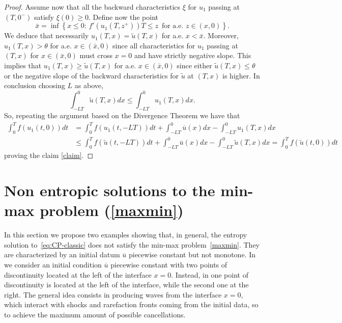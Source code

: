 \documentclass[a4paper, 10pt, final]{article}
\begin{document}
\begin{proof}
  Assume now that all the 
  backward characteristics $\xi$ for $u_1$ passing at $(T,0^-)$ satisfy $\xi(0) \ge 0$. 
  Define now the point
  \begin{equation*}
    \bar x = \inf \left\{x\leq 0\colon\,  f'(u_1(T,z^+))T \le z \, 
    \text{ for a.e. $z\in (x,0)$}\right\}.
  \end{equation*}  
  We deduce that  necessarily $u_1(T,x)=\widetilde u(T,x)$ for a.e. $x< \bar x$. 
  Moreover,  $u_1(T,x)> \theta$ for a.e. $x\in (\bar x, 0)$ 
  since all characteristics for $u_1$ passing at $(T,x)$ for $x\in (\bar x, 0)$ must cross $x=0$ and have strictly negative slope.
  This implies that $u_1(T,x)\geq \widetilde u(T,x)$ for a.e. $x\in (\bar x, 0)$ since either $\widetilde u(T,x)\leq \theta$
   or the negative slope of the backward characteristics for $\widetilde u$ at $(T,x)$ is higher. 
  In conclusion choosing $L$ as above, 
  \[\int_{-LT}^0 \widetilde u(T,x)dx\leq \int_{-LT}^0  u_1(T,x)dx. \]
  So, repeating the argument based on the Divergence Theorem 
  we have that
  \begin{align*}
    \int_0^{T} f(u_1(t,0))dt
    & = \int_0^{T} f(u_1(t, -LT))dt + \int_{-LT}^0 \overline u(x) dx -\int_{-LT}^0 u_1(T,x)dx
    \\
    & \leq  \int_0^{T} f(\widetilde u(t, -LT))dt + \int_{-LT}^0  \overline u (x)dx 
    -\int_{-LT}^0 \widetilde u(T,x)dx
    = \int_0^{T} f(\widetilde u(t,0))dt
  \end{align*}
  proving the claim \eqref{claim}. 
\end{proof}


	

 

\section{Non entropic solutions to the  min-max problem (\ref{maxmin})}
\label{sectionesempi} 
In this section we propose two examples showing that, in general, the entropy solution
to~\eqref{eq:CP-classic} does not satisfy the min-max problem~\eqref{maxmin}.
They are characterized by an initial datum $\overline{u}$ 
piecewise constant but not monotone. In  we consider
an initial condition $\overline{u}$ piecewise constant with two points
of discontinuity located at the left of the interface $x=0$.
Instead, in  one point of discontinuity is located at the left of the
interface, while the second one at the right.
The general idea consists in producing waves from the interface $x=0$,
which interact with 
shocks and rarefaction fronts coming from the initial data, so to
achieve the maximum amount of possible cancellations.
 
\end{document}

